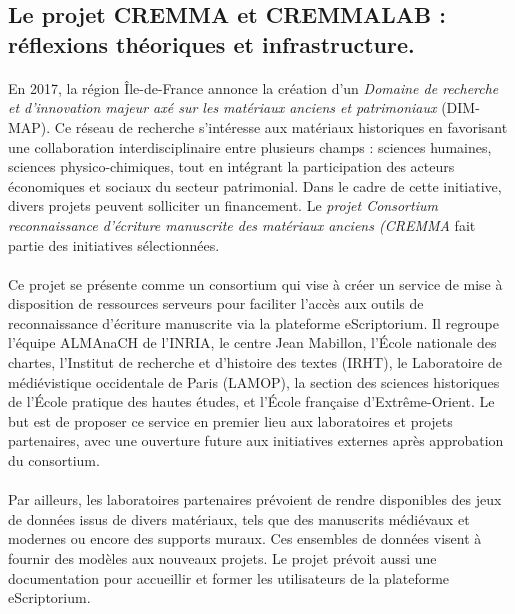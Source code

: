 \documentclass[a4paper,12pt,twoside]{book}
\begin{document}
	\subsection{Le projet CREMMA et CREMMALAB : réflexions théoriques et infrastructure.}
	
\paragraph{}
En 2017, la région Île-de-France annonce la création d'un \textit{Domaine de recherche et d’innovation majeur axé sur les matériaux anciens et patrimoniaux} (DIM-MAP). Ce réseau de recherche s'intéresse aux matériaux historiques en favorisant une collaboration interdisciplinaire entre plusieurs champs : sciences humaines, sciences physico-chimiques, tout en intégrant la participation des acteurs économiques et sociaux du secteur patrimonial. Dans le cadre de cette initiative, divers projets peuvent solliciter un financement. Le \textit{projet Consortium reconnaissance d’écriture manuscrite des matériaux anciens (CREMMA} fait partie des initiatives sélectionnées.
	
\paragraph{}
Ce projet se présente comme un consortium qui vise à créer un service de mise à disposition de ressources serveurs pour faciliter l’accès aux outils de reconnaissance d’écriture manuscrite via la plateforme eScriptorium. Il regroupe l’équipe ALMAnaCH de l'INRIA, le centre Jean Mabillon, l’École nationale des chartes, l’Institut de recherche et d’histoire des textes (IRHT), le Laboratoire de médiévistique occidentale de Paris (LAMOP), la section des sciences historiques de l’École pratique des hautes études, et l’École française d’Extrême-Orient. Le but est de proposer ce service en premier lieu aux laboratoires et projets partenaires, avec une ouverture future aux initiatives externes après approbation du consortium.
	
\paragraph{}
Par ailleurs, les laboratoires partenaires prévoient de rendre disponibles des jeux de données issus de divers matériaux, tels que des manuscrits médiévaux et modernes ou encore des supports muraux. Ces ensembles de données visent à fournir des modèles aux nouveaux projets. Le projet prévoit aussi une documentation pour accueillir et former les utilisateurs de la plateforme eScriptorium.
	
\end{document}
